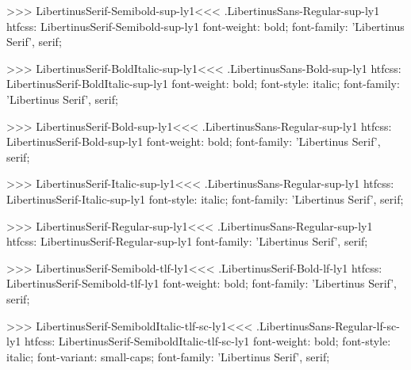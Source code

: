 >>>
\<LibertinusSerif-Semibold-sup-ly1\><<<
.LibertinusSans-Regular-sup-ly1
htfcss:  LibertinusSerif-Semibold-sup-ly1  font-weight: bold; font-family: 'Libertinus Serif', serif;

>>>
\<LibertinusSerif-BoldItalic-sup-ly1\><<<
.LibertinusSans-Bold-sup-ly1
htfcss:  LibertinusSerif-BoldItalic-sup-ly1  font-weight: bold; font-style: italic; font-family: 'Libertinus Serif', serif;

>>>
\<LibertinusSerif-Bold-sup-ly1\><<<
.LibertinusSans-Regular-sup-ly1
htfcss:  LibertinusSerif-Bold-sup-ly1  font-weight: bold; font-family: 'Libertinus Serif', serif;

>>>
\<LibertinusSerif-Italic-sup-ly1\><<<
.LibertinusSans-Regular-sup-ly1
htfcss:  LibertinusSerif-Italic-sup-ly1  font-style: italic; font-family: 'Libertinus Serif', serif;

>>>
\<LibertinusSerif-Regular-sup-ly1\><<<
.LibertinusSans-Regular-sup-ly1
htfcss:  LibertinusSerif-Regular-sup-ly1  font-family: 'Libertinus Serif', serif;

>>>
\<LibertinusSerif-Semibold-tlf-ly1\><<<
.LibertinusSerif-Bold-lf-ly1
htfcss:  LibertinusSerif-Semibold-tlf-ly1  font-weight: bold; font-family: 'Libertinus Serif', serif;

>>>
\<LibertinusSerif-SemiboldItalic-tlf-sc-ly1\><<<
.LibertinusSans-Regular-lf-sc-ly1
htfcss:  LibertinusSerif-SemiboldItalic-tlf-sc-ly1  font-weight: bold; font-style: italic; font-variant: small-caps; font-family: 'Libertinus Serif', serif;

